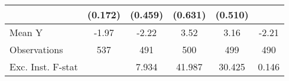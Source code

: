 {\begin{tabular}{l*{5}{c}}
            &     (0.172)         &     (0.459)         &     (0.631)         &     (0.510)         &                     \\
\midrule
Mean Y      &       -1.97         &       -2.22         &        3.52         &        3.16         &       -2.21         \\
Observations&         537         &         491         &         500         &         499         &         490         \\
Exc. Inst. F-stat&                     &       7.934         &      41.987         &      30.425         &       0.146         \\
\bottomrule
\end{tabular}
}
